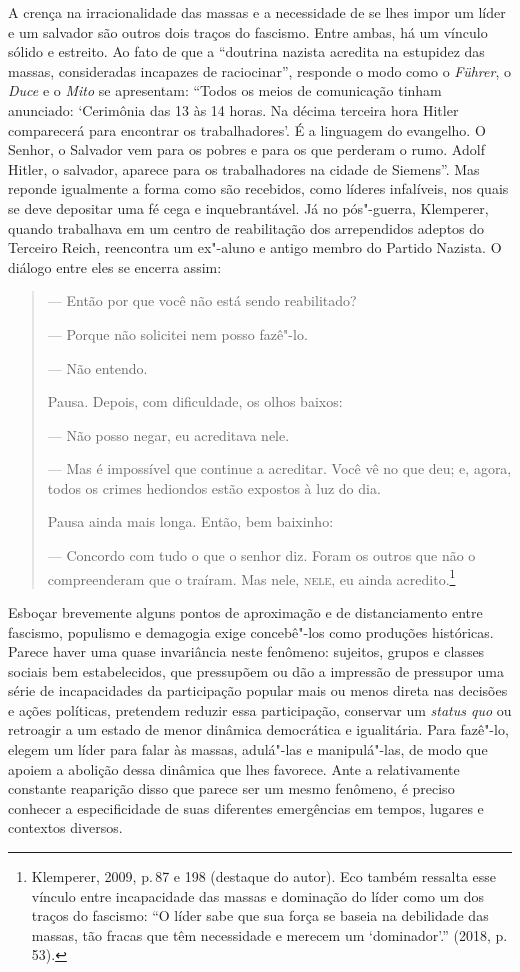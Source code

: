 A crença na irracionalidade das massas e a necessidade de se lhes impor
um líder e um salvador são outros dois traços do fascismo. Entre ambas,
há um vínculo sólido e estreito. Ao fato de que a ``doutrina nazista
acredita na estupidez das massas, consideradas incapazes de
raciocinar'', responde o modo como o \emph{Führer}, o \emph{Duce} e o
\emph{Mito} se apresentam: ``Todos os meios de comunicação tinham
anunciado: `Cerimônia das 13 às 14 horas. Na décima terceira hora Hitler
comparecerá para encontrar os trabalhadores'. É a linguagem do
evangelho. O Senhor, o Salvador vem para os pobres e para os que
perderam o rumo. Adolf Hitler, o salvador, aparece para os trabalhadores
na cidade de Siemens''. Mas reponde igualmente a forma como são
recebidos, como líderes infalíveis, nos quais se deve depositar uma fé
cega e inquebrantável. Já no pós"-guerra, Klemperer, quando trabalhava em
um centro de reabilitação dos arrependidos adeptos do Terceiro Reich,
reencontra um ex"-aluno e antigo membro do Partido Nazista. O diálogo
entre eles se encerra assim:

\begin{quote}
\forceindent{}--- Então por que você não está sendo reabilitado?

--- Porque não solicitei nem posso fazê"-lo.

--- Não entendo.

Pausa. Depois, com dificuldade, os olhos baixos:

--- Não posso negar, eu acreditava nele.

--- Mas é impossível que continue a acreditar. Você vê no que deu; e,
agora, todos os crimes hediondos estão expostos à luz do dia.

Pausa ainda mais longa. Então, bem baixinho:

--- Concordo com tudo o que o senhor diz. Foram os outros que não o
compreenderam que o traíram. Mas nele, \textsc{nele}, eu ainda
acredito.\footnote{Klemperer, 2009, p.\,87 e 198 (destaque do autor). Eco
  também ressalta esse vínculo entre incapacidade das massas e dominação
  do líder como um dos traços do fascismo: ``O líder sabe que sua força
  se baseia na debilidade das massas, tão fracas que têm necessidade e
  merecem um `dominador'.'' (2018, p.\,53).}
\end{quote}

Esboçar brevemente alguns pontos de aproximação e de distanciamento
entre fascismo, populismo e demagogia exige concebê"-los como produções
históricas. Parece haver uma quase invariância neste fenômeno: sujeitos,
grupos e classes sociais bem estabelecidos, que pressupõem ou dão a
impressão de pressupor uma série de incapacidades da participação
popular mais ou menos direta nas decisões e ações políticas, pretendem
reduzir essa participação, conservar um \emph{status quo} ou retroagir a
um estado de menor dinâmica democrática e igualitária. Para fazê"-lo,
elegem um líder para falar às massas, adulá"-las e manipulá"-las, de modo
que apoiem a abolição dessa dinâmica que lhes favorece. Ante a
relativamente constante reaparição disso que parece ser um mesmo
fenômeno, é preciso conhecer a especificidade de suas diferentes
emergências em tempos, lugares e contextos diversos.

